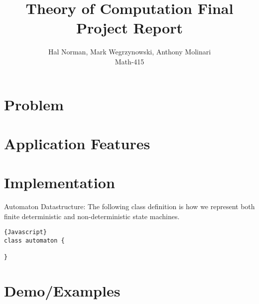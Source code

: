 \documentclass[12pt]{article}
\begin{document}
\title{Theory of Computation Final Project Report}%
\author{Hal Norman, Mark Wegrzynowski, Anthony Molinari\\ %
Math-415 }

\maketitle

\section*{Problem}

\section*{Application Features}

\section*{Implementation}
Automaton Datastructure:
The following class definition is how we represent both finite deterministic and non-deterministic state machines.
\begin{lstlisting}{Javascript}
class automaton {

}
\end{lstlisting}

\section*{Demo/Examples}
\end{document}
